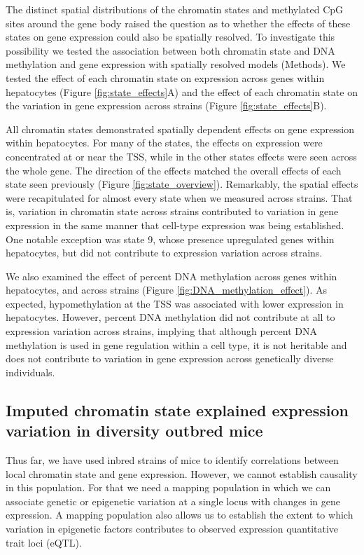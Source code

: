 \documentclass[10pt,letterpaper]{article}
\begin{document}
The distinct spatial distributions of the chromatin states and
methylated CpG sites around the gene body raised the question as to
whether the effects of these states on gene expression could also be
spatially resolved. To investigate this possibility we tested the
association between both chromatin state and DNA methylation and gene
expression with spatially resolved models (Methods). We tested the
effect of each chromatin state on expression across genes within
hepatocytes (Figure \ref{fig:state_effects}A) and the effect of each
chromatin state on the variation in gene expression across strains
(Figure \ref{fig:state_effects}B).

All chromatin states demonstrated spatially dependent effects on gene
expression within hepatocytes. For many of the states, the effects on
expression were concentrated at or near the TSS, while in the other
states effects were seen across the whole gene. The direction of the
effects matched the overall effects of each state seen previously
(Figure \ref{fig:state_overview}). Remarkably, the spatial effects were
recapitulated for almost every state when we measured across strains.
That is, variation in chromatin state across strains contributed to
variation in gene expression in the same manner that cell-type
expression was being established. One notable exception was state 9,
whose presence upregulated genes within hepatocytes, but did not
contribute to expression variation across strains.

We also examined the effect of percent DNA methylation across genes
within hepatocytes, and across strains (Figure
\ref{fig:DNA_methylation_effect}). As expected, hypomethylation at the
TSS was associated with lower expression in hepatocytes. However,
percent DNA methylation did not contribute at all to expression
variation across strains, implying that although percent DNA methylation
is used in gene regulation within a cell type, it is not heritable and
does not contribute to variation in gene expression across genetically
diverse individuals.

\hypertarget{imputed-chromatin-state-explained-expression-variation-in-diversity-outbred-mice}{%
\subsection{Imputed chromatin state explained expression variation in
diversity outbred
mice}\label{imputed-chromatin-state-explained-expression-variation-in-diversity-outbred-mice}}

Thus far, we have used inbred strains of mice to identify correlations
between local chromatin state and gene expression. However, we cannot
establish causality in this population. For that we need a mapping
population in which we can associate genetic or epigenetic variation at
a single locus with changes in gene expression. A mapping population
also allows us to establish the extent to which variation in epigenetic
factors contributes to observed expression quantitative trait loci
(eQTL).
\end{document}
